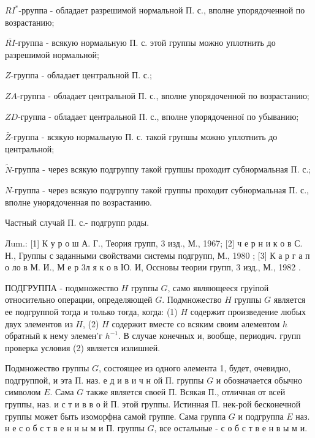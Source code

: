 \documentclass[10pt]{article}
\begin{document}
$R I^{*}$-рруппа - обладает разрешимой нормальной П. с., вполне упорядоченной по возрастанию;



$\overline{R I}$-группа - всякую нормальную П. с. этой группы можно уплотнить до разрешимой нормальной;



$Z$-группа - обладает центральной П. с.;



$Z A$-группа - обладает центральной П. с., вполне упорядоченной по возрастанию;



$Z D$-группа - обладает центральной П. с., вполне упорядоченної по убыванию;



$\bar{Z}$-группа - всякую нормальную П. с. такой групшы можно уплотнить до центральной;



$\tilde{N}$-группа - через всякую подгруппу такой групшы проходит субнормальная П. с.;



$N$-группа - через всякую подгруппу такой группы проходит субнормальная П. с., вполне унорядоченная по возрастанию.



Частный случай П. с.- подгрупп рлды.



Лum.: [1] К у р о ш А. Г., Теория групп, 3 изд., М., 1967; [2] ч е р н и к о в С. Н., Группы с заданными свойствами системы подгрупп, М., 1980 ; [3] К а р г а п о ло в М. И., М е р 3л я к о в Ю. И, Оссновы теории групп, 3 изд., М., 1982 .



ПОДГРУППА - подмножество $H$ группы $G$, само являющееся груіпой относительно операции, определяющей $G$. Подмножество $H$ группы $G$ является ее подгруппой тогда и только тогда, когда: (1) $H$ содержит произведение любых двух элементов из $H$, (2) $H$ содержит вместе со всяким своим әлемевтом $h$ обратный к нему элемен'г $h^{-1}$. В случае конечных и, вообще, периодич. групп проверка условия (2) является излишней.



Подмножество группы $G$, состоящее из одного әлемента 1, будет, очевидно, подгруппой, и эта П. наз. е д и в и ч н ой П. группы $G$ и обозначается обычно символом $E$. Сама $G$ также является своей П. Всякая П., отличная от всей группы, наз. и с т и в в о й П. этой группы. Истинная П. нек-рой бесконечной группы может быть изоморфна самой группе. Сама группа $G$ и подгруппа $E$ наз. н е с о б с т в е н н ы м и П. группы $G$, все остальные - с о б с т в е н в ы м и.
\end{document}
